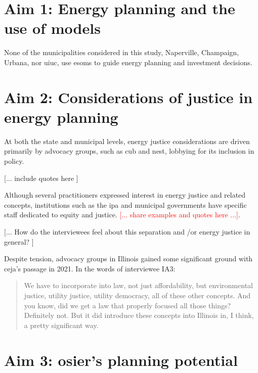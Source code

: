 \section{Aim 1: Energy planning and the use of models}

None of the municipalities considered in this study, Naperville, Champaign,
Urbana, nor \ac{uiuc}, use \acp{esom} to guide energy planning and investment
decisions.  



\section{Aim 2: Considerations of justice in energy planning}

At both the state and municipal levels, energy justice considerations are driven
primarily by advocacy groups, such as \ac{cub} and \ac{nest}, lobbying for its
inclusion in policy. 

[... include quotes here ]

Although several practitioners expressed interest in energy justice and related
concepts, institutions such as the \ac{ipa} and municipal governments have
specific staff dedicated to equity and justice. \textcolor{red}{[... share
examples and quotes here ...]}. 

[... How do the interviewees feel about this separation and /or energy justice
in general? ]

Despite tension, advocacy groups in Illinois gained some significant ground with
\ac{ceja}'s passage in 2021. In the words of interviewee IA3:

\begin{quote}
    We have to incorporate into law, not just affordability, but environmental
    justice, utility justice, utility democracy, all of these other concepts.
    And you know, did we get a law that properly focused all those things?
    Definitely not. But it did introduce these concepts into Illinois in, I
    think, a pretty significant way.
\end{quote}


\section{Aim 3: \ac{osier}'s planning potential}


